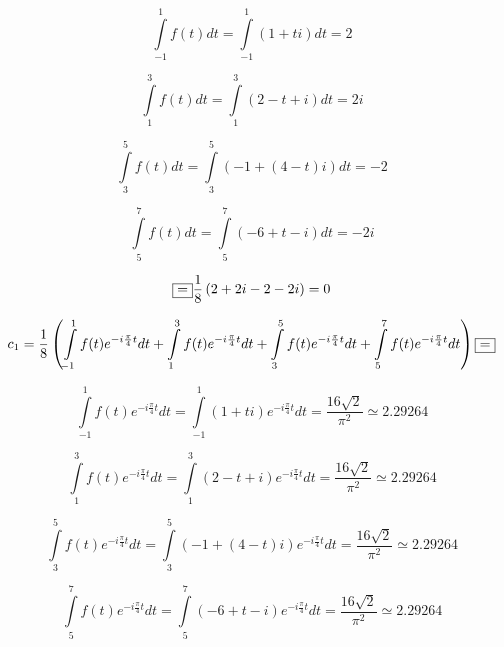 \documentclass[a5paper, 10pt]{article}
\theoremstyle{definition}
\theoremstyle{plain}
\theoremstyle{remark}
\begin{document}
\begin{equation}
\int \limits_{-1}^{1} f(t) dt = \int \limits_{-1}^{1} \left( 1 + ti  \right) dt = 2
\end{equation}

\begin{equation}
\int \limits_{1}^{3} f(t) dt = \int \limits_{1}^{3} \left( 2 - t + i  \right) dt = 2i
\end{equation}

\begin{equation}
\int \limits_{3}^{5} f(t) dt = \int \limits_{3}^{5} \left( -1 + (4-t)i  \right) dt = -2
\end{equation}

\begin{equation}
\int \limits_{5}^{7} f(t) dt = \int \limits_{5}^{7} \left( - 6 + t - i \right) dt = -2i
\end{equation}

\begin{equation}
\fbox{=} \frac{1}{8} \left(2 + 2i - 2 - 2i \right) = 0
\end{equation}


\begin{multline*}
c_1 =\frac{1}{8} \left(\int \limits_{-1}^{1} f(t) e^{-i \frac{\pi}{4} t}  dt + \int \limits_{1}^{3} f(t) e^{-i \frac{\pi}{4} t} dt + \int \limits_{3}^{5} f(t) e^{-i \frac{\pi}{4} t}  dt 
+ \int \limits_{5}^{7} f(t) e^{-i \frac{\pi}{4} t}  dt   \right) \fbox{=}
\end{multline*}


\begin{equation}
\int \limits_{-1}^{1} f(t) e^{-i \frac{\pi}{4} t} dt = \int \limits_{-1}^{1} \left( 1 + ti  \right) e^{-i \frac{\pi}{4} t}  dt = \frac{16 \sqrt{2}}{\pi^2} \simeq 2.29264
\end{equation}

\begin{equation}
\int \limits_{1}^{3} f(t)e^{-i \frac{\pi}{4} t} dt = \int \limits_{1}^{3} \left( 2 - t + i  \right) e^{-i \frac{\pi}{4} t} dt = \frac{16 \sqrt{2}}{\pi^2} \simeq 2.29264
\end{equation}

\begin{equation}
\int \limits_{3}^{5} f(t)e^{-i \frac{\pi}{4} t} dt = \int \limits_{3}^{5} \left( -1 + (4-t)i  \right) e^{-i \frac{\pi}{4} t} dt = \frac{16 \sqrt{2}}{\pi^2} \simeq 2.29264
\end{equation}

\begin{equation}
\int \limits_{5}^{7} f(t)e^{-i \frac{\pi}{4} t} dt = \int \limits_{5}^{7} \left( - 6 + t - i \right) e^{-i \frac{\pi}{4} t} dt = \frac{16 \sqrt{2}}{\pi^2} \simeq 2.29264
\end{equation}
\end{document}
